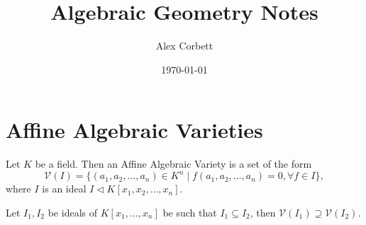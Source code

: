\documentclass[titlepage]{article}
\title{Algebraic Geometry Notes}
\author{Alex Corbett}
\theoremstyle{remark}
\begin{document}
\date{\today}
\maketitle
\pagebreak
\section{Affine Algebraic Varieties}
  \begin{definition}
    Let $K$ be a field. Then an Affine Algebraic Variety is a set of the form
    \[\mathcal{V}(I)=\{(a_1,a_2,\dots,a_n)\in K^n\mid f(a_1,a_2,\dots,a_n)=0, \forall f\in I\},\]
    where $I$ is an ideal $I\vartriangleleft K[x_1,x_2,\dots,x_n]$.
  \end{definition}
  \begin{proposition}
    Let $I_1,I_2$ be ideals of $K[x_1,\dots,x_n]$ be such that $I_1\subseteq I_2$, then $\mathcal{V}(I_1)\supseteq\mathcal{V}(I_2)$.
  \end{proposition}
\end{document}
